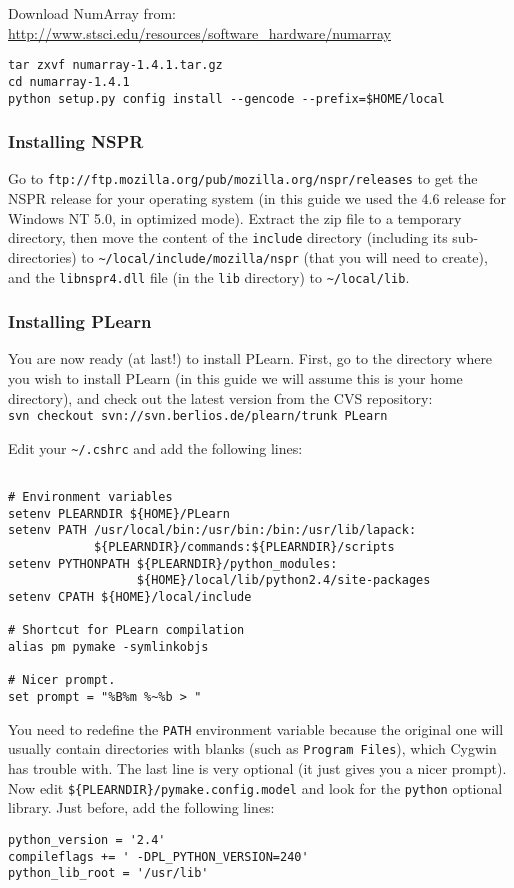 \documentclass[11pt]{book}
\begin{document}
Download NumArray from: \\
\url{http://www.stsci.edu/resources/software_hardware/numarray}

\begin{verbatim}
tar zxvf numarray-1.4.1.tar.gz
cd numarray-1.4.1
python setup.py config install --gencode --prefix=$HOME/local
\end{verbatim}

\subsubsection{Installing NSPR}

Go to \verb!ftp://ftp.mozilla.org/pub/mozilla.org/nspr/releases! to get
the NSPR release for your operating system (in this guide we used the
4.6 release for Windows NT 5.0, in optimized mode).
Extract the zip file to a temporary directory, then move the content of the
\verb!include! directory (including its sub-directories) to \verb!~/local/include/mozilla/nspr! (that you
will need to create), and the
\verb!libnspr4.dll! file (in the \verb!lib! directory) to \verb!~/local/lib!.

\subsubsection{Installing PLearn}

You are now ready (at last!) to install PLearn. First, go to the directory
where you wish to install PLearn (in this guide we will assume this is your
home directory), and check out the latest
version from the CVS repository:\\
\verb!svn checkout svn://svn.berlios.de/plearn/trunk PLearn!

Edit your \verb!~/.cshrc! and add the following lines:
\begin{verbatim}

# Environment variables
setenv PLEARNDIR ${HOME}/PLearn
setenv PATH /usr/local/bin:/usr/bin:/bin:/usr/lib/lapack:
            ${PLEARNDIR}/commands:${PLEARNDIR}/scripts
setenv PYTHONPATH ${PLEARNDIR}/python_modules:
                  ${HOME}/local/lib/python2.4/site-packages
setenv CPATH ${HOME}/local/include

# Shortcut for PLearn compilation
alias pm pymake -symlinkobjs

# Nicer prompt.
set prompt = "%B%m %~%b > "
\end{verbatim}

You need to redefine the \verb!PATH! environment variable because the
original one will usually contain directories with blanks (such as
\verb!Program Files!), which Cygwin has trouble with.
The last line is very optional (it just gives you a nicer prompt).
Now edit \verb!${PLEARNDIR}/pymake.config.model! and look for the
\verb!python! optional library.
Just before, add the following lines:
\begin{verbatim}
python_version = '2.4'
compileflags += ' -DPL_PYTHON_VERSION=240'
python_lib_root = '/usr/lib'
\end{verbatim}
\end{document}
